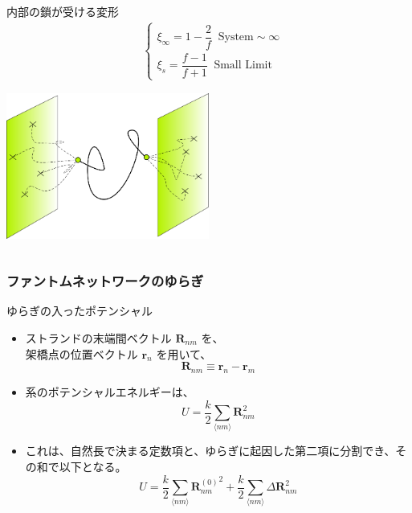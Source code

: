 \documentclass[12pt, dvipdfmx]{beamer}
\begin{document}
\begin{frame}
\begin{columns}[totalwidth=1\textwidth]
\begin{exampleblock}{内部の鎖が受ける変形}
\begin{align*}
							&\begin{cases}
							\xi_{\infty} = 1-\dfrac{2}{f} \;\; \text{System}\sim \infty \\[8pt]
							\xi_{s} = \dfrac{f-1}{f+1} \;\; \text{Small Limit}
							\end{cases}
					\end{align*}
					\vspace{-5mm}
					\begin{center}
						\includegraphics[width=0.5\textwidth]{phantom.png}
					\end{center}
				\end{exampleblock}
		\end{columns}
\end{frame}

\begin{frame}
	\frametitle{ファントムネットワークのゆらぎ}
		\begin{block}{ゆらぎの入ったポテンシャル}
			\begin{itemize}
				\item ストランドの末端間ベクトル $\bm{R}_{nm}$ を、\\架橋点の位置ベクトル $\bm{r}_n$ を用いて、
					\footnotesize
					\begin{equation*}
						\bm{R}_{nm} \equiv \bm{r}_n-\bm{r}_m
					\end{equation*}
					\normalsize
				\item 系のポテンシャルエネルギーは、
					\footnotesize
					\begin{equation*}
						U=\dfrac{k}{2} \sum_{\langle nm \rangle} \bm{R}_{nm}^2
					\end{equation*}
					\normalsize
				\item これは、自然長で決まる定数項と、ゆらぎに起因した第二項に分割でき、その和で以下となる。
					\footnotesize
					\begin{equation*}
						U=\dfrac{k}{2} \sum_{\langle nm \rangle} {\bm{R}_{nm}^{(0)}}^2 + \dfrac{k}{2} \sum_{\langle nm \rangle} \Delta \bm{R}_{nm}^2
					\end{equation*}
					\normalsize
			\end{itemize}
		\end{block}
\end{frame}
\end{document}
